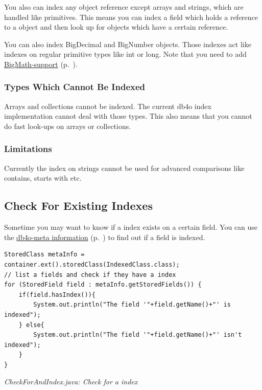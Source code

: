 You also can index any object reference except arrays and strings, which are handled like primitives. This means you can index a field which holds a reference to a object and then look up for objects which have a certain reference.

You can also index BigDecimal and BigNumber objects. Those indexes act like indexes on regular primitive types like int or long. Note that you need to add \hyperref[ref:advanced-topics-type-handling-bigmath]{BigMath-support} (p.~\pageref{ref:advanced-topics-type-handling-bigmath}).

\subsubsection*{Types Which Cannot Be Indexed}

Arrays and collections cannot be indexed. The current db4o index implementation cannot deal with those types. This also means that you cannot do fast look-ups on arrays or collections.

\subsubsection*{Limitations}

Currently the index on strings cannot be used for advanced comparisons like contains, starts with etc.

\subsection{Check For Existing Indexes}
\label{ref:basics-indexing-check-for-index}

Sometime you may want to know if a index exists on a certain field. You can use the \hyperref[ref:advanced-topics-db4o-meta-information]{db4o-meta information} (p.~\pageref{ref:advanced-topics-db4o-meta-information}) to find out if a field is indexed.

\begin{lstlisting}
StoredClass metaInfo = container.ext().storedClass(IndexedClass.class);
// list a fields and check if they have a index
for (StoredField field : metaInfo.getStoredFields()) {
    if(field.hasIndex()){
        System.out.println("The field '"+field.getName()+"' is indexed");
    } else{
        System.out.println("The field '"+field.getName()+"' isn't indexed");
    }
}
\end{lstlisting}

{\small\itshape CheckForAndIndex.java: Check for a index\par}
\medskip

